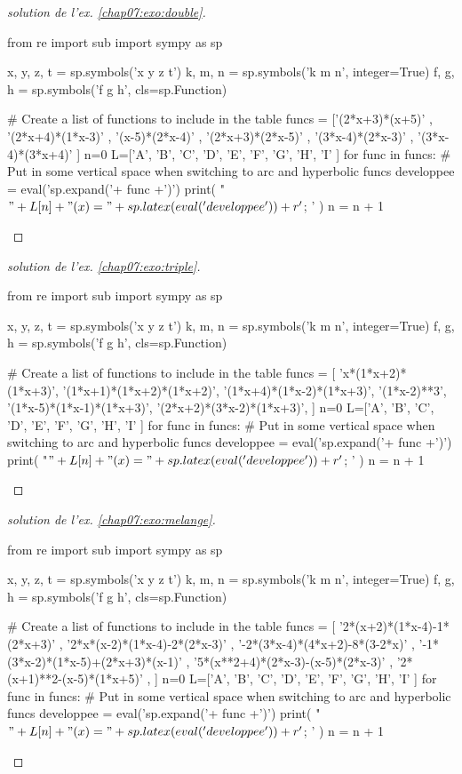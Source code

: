 \documentclass[main.tex]{subfiles}
\begin{document}
\begin{proof}[solution de l'ex. \ref{chap07:exo:double}]
\begin{pycode}
from re import sub
import sympy as sp

x, y, z, t = sp.symbols('x y z t')
k, m, n = sp.symbols('k m n', integer=True)
f, g, h = sp.symbols('f g h', cls=sp.Function)

# Create a list of functions to include in the table
funcs = ['(2*x+3)*(x+5)' ,
'(2*x+4)*(1*x-3)' ,
'(x-5)*(2*x-4)' ,
'(2*x+3)*(2*x-5)' ,
'(3*x-4)*(2*x-3)' ,
'(3*x-4)*(3*x+4)' 
]
n=0
L=['A', 'B', 'C', 'D', 'E', 'F', 'G', 'H', 'I'  ]
for func in funcs:
	# Put in some vertical space when switching to arc and hyperbolic funcs 
	developpee =  eval('sp.expand('+ func +')') 
	print( "$"+L[n] + "(x) =" + sp.latex( eval('developpee') )  + r'$; ' ) 
	n     = n + 1 
\end{pycode}
\end{proof}
\begin{proof}[solution de l'ex. \ref{chap07:exo:triple}]
\begin{pycode}
from re import sub
import sympy as sp

x, y, z, t = sp.symbols('x y z t')
k, m, n = sp.symbols('k m n', integer=True)
f, g, h = sp.symbols('f g h', cls=sp.Function)

# Create a list of functions to include in the table
funcs = [
'x*(1*x+2)*(1*x+3)', 
'(1*x+1)*(1*x+2)*(1*x+2)', 
'(1*x+4)*(1*x-2)*(1*x+3)', 
'(1*x-2)**3', 
'(1*x-5)*(1*x-1)*(1*x+3)', 
'(2*x+2)*(3*x-2)*(1*x+3)', 
]
n=0
L=['A', 'B', 'C', 'D', 'E', 'F', 'G', 'H', 'I'  ]
for func in funcs:
	# Put in some vertical space when switching to arc and hyperbolic funcs 
	developpee =  eval('sp.expand('+ func +')') 
	print( "$"+L[n] + "(x) =" + sp.latex( eval('developpee') )  + r'$; ' ) 
	n     = n + 1 
\end{pycode}
\end{proof}
\begin{proof}[solution de l'ex. \ref{chap07:exo:melange}]
\begin{pycode}
from re import sub
import sympy as sp

x, y, z, t = sp.symbols('x y z t')
k, m, n = sp.symbols('k m n', integer=True)
f, g, h = sp.symbols('f g h', cls=sp.Function)

# Create a list of functions to include in the table
funcs = [
'2*(x+2)*(1*x-4)-1*(2*x+3)' ,
'2*x*(x-2)*(1*x-4)-2*(2*x-3)' ,
'-2*(3*x-4)*(4*x+2)-8*(3-2*x)' ,
'-1*(3*x-2)*(1*x-5)+(2*x+3)*(x-1)' ,
'5*(x**2+4)*(2*x-3)-(x-5)*(2*x-3)' ,
'2*(x+1)**2-(x-5)*(1*x+5)' ,
]
n=0
L=['A', 'B', 'C', 'D', 'E', 'F', 'G', 'H', 'I'  ]
for func in funcs:
	# Put in some vertical space when switching to arc and hyperbolic funcs 
	developpee =  eval('sp.expand('+ func +')') 
	print( "$"+L[n] + "(x) =" + sp.latex( eval('developpee') )  + r'$; ' ) 
	n     = n + 1 
\end{pycode}
\end{proof} 
\end{document}
